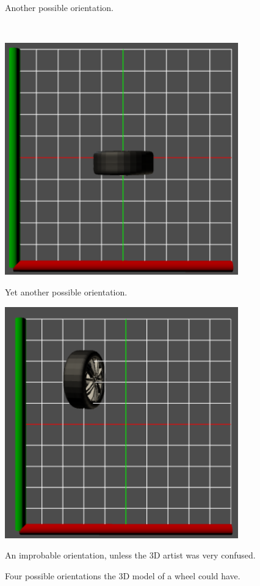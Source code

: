\begin{figure}
\begin{minipage}{.5\textwidth}
  	\caption{Another possible orientation.}
  	\label{fig:wheel2}
  \end{minipage}\\
  \begin{minipage}{.5\textwidth}
  	\includegraphics[width=0.9\textwidth]{../assets/wheel3.png}
  	\caption{Yet another possible orientation.}
  	\label{fig:wheel3}
  \end{minipage}
  \begin{minipage}{.5\textwidth}
  	\includegraphics[width=0.9\textwidth]{../assets/wheel4.png}
  	\caption{An improbable orientation, unless the \gls{3D} artist was very confused.}
  	\label{fig:wheel4}
  \end{minipage}
  \caption*{Four possible orientations the \gls{3D} model of a wheel could have.}
\end{figure}

